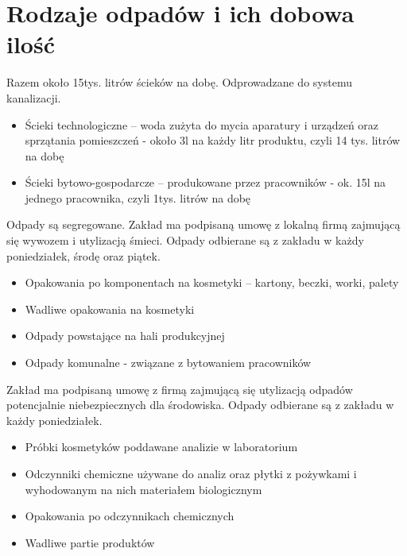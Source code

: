 \section{Rodzaje odpadów i ich dobowa ilość}

Razem około 15tys. litrów ścieków na dobę. Odprowadzane do systemu kanalizacji.
\begin{itemize}
\item Ścieki technologiczne – woda zużyta do mycia aparatury i urządzeń oraz sprzątania pomieszczeń - około 3l na każdy litr produktu, czyli 14 tys. litrów na dobę
\item Ścieki bytowo-gospodarcze – produkowane przez pracowników - ok. 15l na jednego pracownika, czyli 1tys. litrów na dobę
\end{itemize}\vspace{\baselineskip}

Odpady są segregowane. Zakład ma podpisaną umowę z lokalną firmą zajmującą się wywozem i utylizacją śmieci. Odpady odbierane są z zakładu w każdy poniedziałek, środę oraz piątek.
\begin{itemize}
\item Opakowania po komponentach na kosmetyki – kartony, beczki, worki, palety
\item Wadliwe opakowania na kosmetyki
\item Odpady powstające na hali produkcyjnej
\item Odpady komunalne - związane z bytowaniem pracowników
\end{itemize}\vspace{\baselineskip}

Zakład ma podpisaną umowę z firmą zajmującą się utylizacją odpadów potencjalnie niebezpiecznych dla środowiska. Odpady odbierane są z zakładu w każdy poniedziałek.
\begin{itemize}
\item Próbki kosmetyków poddawane analizie w laboratorium
\item Odczynniki chemiczne używane do analiz oraz płytki z pożywkami i wyhodowanym na nich materiałem biologicznym
\item Opakowania po odczynnikach chemicznych
\item Wadliwe partie produktów
\end{itemize}
